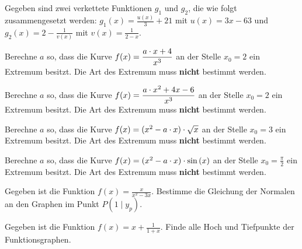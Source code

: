 \documentclass[11pt]{exam}
\begin{document}
\begin{questions}
\noaddpoints
\question[\totalpoints]
\addpoints
Gegeben sind zwei verkettete Funktionen $g_1$ und $g_2$, die wie folgt zusammengesetzt werden: $g_1(x)=\frac{u(x)}{3}+21$ mit $u(x)=3x-63$ und $g_2(x)=2-\frac{1}{v(x)}$ mit $v(x)=\frac{1}{2-x}$.


\question[5]
Berechne $a$ so, dass die Kurve $\displaystyle f(x)=\frac{a\cdot x+4}{x^3}$ an der Stelle $x_0=2$ ein Extremum besitzt. Die Art des Extremum muss \textbf{nicht} bestimmt werden.


\question[5]
Berechne $a$ so, dass die Kurve $\displaystyle f(x)=\frac{a\cdot x^2+4x-6}{x^3}$ an der Stelle $x_0=2$ ein Extremum besitzt. Die Art des Extremum muss \textbf{nicht} bestimmt werden.


\question[5]
Berechne $a$ so, dass die Kurve $f(x)=(x^2-a\cdot x)\cdot\sqrt{x}$ an der Stelle $x_0=3$ ein Extremum besitzt. Die Art des Extremum muss \textbf{nicht} bestimmt werden.


\question[5]
Berechne $a$ so, dass die Kurve $f(x)=(x^2-a\*x)\*\sin{x}$ an der Stelle $x_0=\frac{\pi}{2}$ ein Extremum besitzt. Die Art des Extremum muss \textbf{nicht} bestimmt werden.


\question[3]
Gegeben ist die Funktion $\displaystyle f(x)=\frac{x}{x^2-3x}$. Bestimme die Gleichung der Normalen an den Graphen im Punkt $P(1\mid y_p)$.


\question[4] %
Gegeben ist die Funktion $f(x)=x+\frac{1}{1+x}$. Finde alle Hoch und Tiefpunkte der Funktionsgraphen.



\end{questions}
\end{document}
